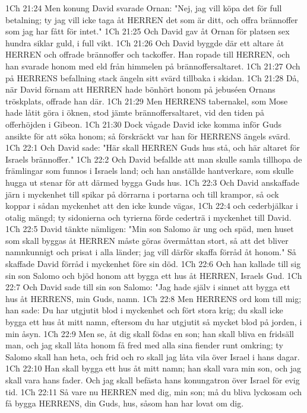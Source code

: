 1Ch 21:24  Men konung David svarade Ornan: "Nej, jag vill köpa det för full betalning; ty jag vill icke taga åt HERREN det som är ditt, och offra brännoffer som jag har fått för intet."
1Ch 21:25  Och David gav åt Ornan för platsen sex hundra siklar guld, i full vikt.
1Ch 21:26  Och David byggde där ett altare åt HERREN och offrade brännoffer och tackoffer. Han ropade till HERREN, och han svarade honom med eld från himmelen på brännoffersaltaret.
1Ch 21:27  Och på HERRENS befallning stack ängeln sitt svärd tillbaka i skidan.
1Ch 21:28  Då, när David förnam att HERREN hade bönhört honom på jebuséen Ornans tröskplats, offrade han där.
1Ch 21:29  Men HERRENS tabernakel, som Mose hade låtit göra i öknen, stod jämte brännoffersaltaret, vid den tiden på offerhöjden i Gibeon.
1Ch 21:30  Dock vågade David icke komma inför Guds ansikte för att söka honom; så förskräckt var han för HERRENS ängels svärd.
1Ch 22:1  Och David sade: "Här skall HERREN Guds hus stå, och här altaret för Israels brännoffer."
1Ch 22:2  Och David befallde att man skulle samla tillhopa de främlingar som funnos i Israels land; och han anställde hantverkare, som skulle hugga ut stenar för att därmed bygga Guds hus.
1Ch 22:3  Och David anskaffade järn i myckenhet till spikar på dörrarna i portarna och till krampor, så ock koppar i sådan myckenhet att den icke kunde vägas,
1Ch 22:4  och cederbjälkar i otalig mängd; ty sidonierna och tyrierna förde cederträ i myckenhet till David.
1Ch 22:5  David tänkte nämligen: "Min son Salomo är ung och späd, men huset som skall byggas åt HERREN måste göras övermåttan stort, så att det bliver namnkunnigt och prisat i alla länder; jag vill därför skaffa förråd åt honom." Så skaffade David förråd i myckenhet före sin död.
1Ch 22:6  Och han kallade till sig sin son Salomo och bjöd honom att bygga ett hus åt HERREN, Israels Gud.
1Ch 22:7  Och David sade till sin son Salomo: "Jag hade själv i sinnet att bygga ett hus åt HERRENS, min Guds, namn.
1Ch 22:8  Men HERRENS ord kom till mig; han sade: Du har utgjutit blod i myckenhet och fört stora krig; du skall icke bygga ett hus åt mitt namn, eftersom du har utgjutit så mycket blod på jorden, i min åsyn.
1Ch 22:9  Men se, åt dig skall födas en son; han skall bliva en fridsäll man, och jag skall låta honom få fred med alla sina fiender runt omkring; ty Salomo skall han heta, och frid och ro skall jag låta vila över Israel i hans dagar.
1Ch 22:10  Han skall bygga ett hus åt mitt namn; han skall vara min son, och jag skall vara hans fader. Och jag skall befästa hans konungatron över Israel för evig tid.
1Ch 22:11  Så vare nu HERREN med dig, min son; må du bliva lyckosam och få bygga HERRENS, din Guds, hus, såsom han har lovat om dig.
